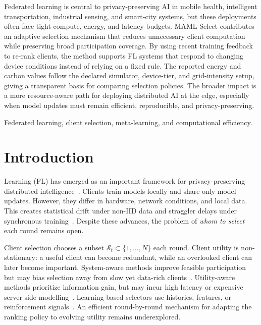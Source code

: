 \documentclass[journal]{IEEEtran}
\newcommand{\revision}[1]{#1}
\begin{document}
\renewcommand\IEEEkeywordsname{Impact Statement}
\begin{IEEEkeywords}
\revision{Federated learning is central to privacy-preserving AI in mobile health, intelligent transportation, industrial sensing, and smart-city systems, but these deployments often face tight compute, energy, and latency budgets. MAML-Select contributes an adaptive selection mechanism that reduces unnecessary client computation while preserving broad participation coverage. By using recent training feedback to re-rank clients, the method supports FL systems that respond to changing device conditions instead of relying on a fixed rule. The reported energy and carbon values follow the declared simulator, device-tier, and grid-intensity setup, giving a transparent basis for comparing selection policies. The broader impact is a more resource-aware path for deploying distributed AI at the edge, especially when model updates must remain efficient, reproducible, and privacy-preserving.}


\end{IEEEkeywords}
\renewcommand\IEEEkeywordsname{Index Terms}
\begin{IEEEkeywords}
Federated learning, client selection, meta-learning, and computational efficiency.
\end{IEEEkeywords}
\section{Introduction}

 Learning (FL) has emerged as \revision{an important} framework for privacy-preserving distributed intelligence~\cite{mcmahan2017communication}. \revision{Clients train models locally and share only model updates. However, they differ in hardware, network conditions, and local data. This creates statistical drift under non-IID data and straggler delays under synchronous training}~\cite{karimireddy2020scaffold,mai2024study,tapwal2026stragglers,forootani2026asynchronous,borazjani2026redefining}. Despite these advances, the problem of \textit{whom to select} each round remains open.

Client selection chooses a subset $\revision{\mathcal{S}_t} \subset \{1, \ldots, N\}$ each round. \revision{Client utility is non-stationary: a useful client can become redundant, while an overlooked client can later become important.} System-aware methods improve feasible participation but may bias selection away from slow yet data-rich clients~\cite{nishio2019client,chai2020tifl}. Utility-aware methods prioritize information gain, but may incur high latency or expensive server-side modelling~\cite{lai2021oort,tang2022fedcor,xu2024federated,yan2023criticalfl,ning2024fedgcs}. Learning-based selectors use histories, features, or reinforcement signals~\cite{wang2020optimizing,pan2024contextual,kazemi2026robust}. \revision{An efficient round-by-round mechanism for adapting the ranking policy to evolving utility remains underexplored.}
\end{document}
